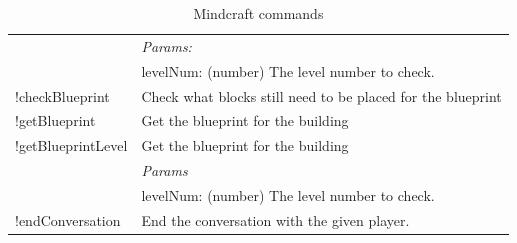 \documentclass{article}
\begin{document}
\begin{table}[]
\begin{tabular}{|p{}|p{}|}
    & \textit{Params:} \\
    & levelNum: (number) The level number to check. \\
    \hline
    !checkBlueprint & Check what blocks still need to be placed for the blueprint \\
    \hline
    !getBlueprint & Get the blueprint for the building \\
    \hline
    !getBlueprintLevel &  Get the blueprint for the building \\
    & \textit{Params} \\
    & levelNum: (number) The level number to check. \\
    \hline
    !endConversation & End the conversation with the given player. \\
    \hline
    \end{tabular}
    \caption{Mindcraft commands}
    \label{tab:mindcraft_commands_3}
\end{table}
\end{document}
